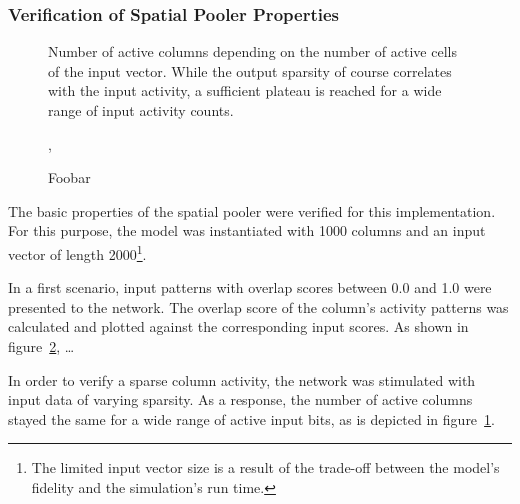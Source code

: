 \subsubsection{Verification of Spatial Pooler Properties}

\begin{figure}
	\begin{center}
		
	\end{center}
	\caption{Number of active columns depending on the number of active cells of the input vector. While the output sparsity of course correlates with the input activity, a sufficient plateau is reached for a wide range of input activity counts.}
	\label{fig:static_spatial_pooler_sparsity}
\end{figure}

\begin{figure}
	\begin{center}
		
	\end{center}
	\caption{Foobar},

	\label{fig:static_spatial_pooler_overlap}
\end{figure}

The basic properties of the spatial pooler were verified for this implementation. For this purpose, the model was instantiated with 1000 columns and an input vector of length 2000\footnote{The limited input vector size is a result of the trade-off between the model's fidelity and the simulation's run time.}.

In a first scenario, input patterns with overlap scores between 0.0 and 1.0 were presented to the network. The overlap score of the column's activity patterns was calculated and plotted against the corresponding input scores. As shown in figure~\ref{fig:static_spatial_pooler_overlap}, …

In order to verify a sparse column activity, the network was stimulated with input data of varying sparsity. As a response, the number of active columns stayed the same for a wide range of active input bits, as is depicted in figure~\ref{fig:static_spatial_pooler_sparsity}.
